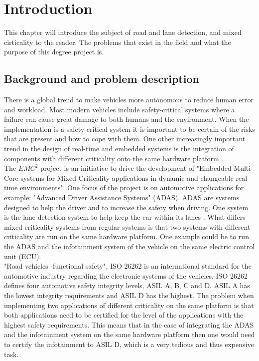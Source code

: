 \chapter{Introduction}
\label{sec:introduction}
This chapter will introduce the subject of road and lane detection, and mixed cirticality to the reader. The problems that exist in the field and what the purpose of this degree project is.


\section{Background and problem description}
There is a global trend to make vehicles more autonomous to reduce human error and workload. Most modern vehicles include safety-critical systems where a failure can cause great damage to both humans and the environment. When the implementation is a safety-critical system it is important to be certain of the risks that are present and how to cope with them. One other increasingly important trend in the design of real-time and embedded systems is the integration of components with different criticality onto the same hardware platform \cite{burns2013mixed}.\\

The $EMC^2$ project \cite{eu} is an initiative to drive the development of "Embedded Multi-Core systems for Mixed Criticality applications in dynamic and changeable real-time environments". One focus of the project is on automotive applications for example: "Advanced Driver Assistance Systems" (ADAS). ADAS are systems designed to help the driver and to increase the safety when driving. One system is the lane detection system to help keep the car within its lanes \cite{BarHillel2014}. What differs mixed criticality systems from regular systems is that two systems with different criticality are run on the same hardware platform. One example could be to run the ADAS and the infotainment system of the vehicle on the same electric control unit (ECU).\\

"Road vehicles -functional safety", ISO 26262 is an international standard for the automotive industry regarding the electronic systems of the vehicles. ISO 26262 defines four automotive safety integrity levels, ASIL A, B, C and D. ASIL A has the lowest integrity requirements and ASIL D has the highest. The problem when implementing two applications of different criticality on the same platform is that both applications need to be certified for the level of the applications with the highest safety requirements. This means that in the case of integrating the ADAS and the infotainment system on the same hardware platform then one would need to certify the infotainment to ASIL D, which is a very tedious and thus expensive task.\\

